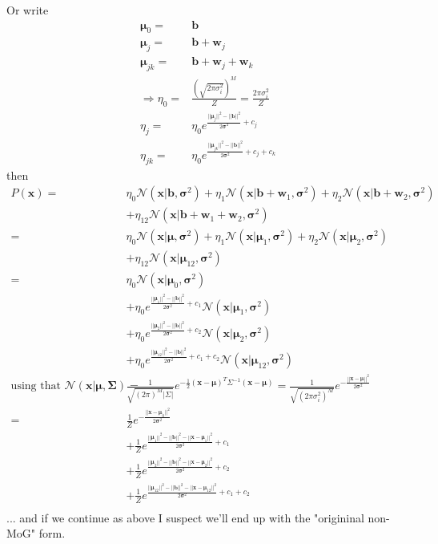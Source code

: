 \documentclass[twoside,english]{uiofysmaster}
\begin{document}
Or write
\begin{align}
	\bm{\mu}_0 =& \bm{b} \\
	\bm{\mu}_j =& \bm{b} + \bm{w}_j \\
	\bm{\mu}_{jk} =& \bm{b} + \bm{w}_j + \bm{w}_k \\
	\Rightarrow 
	\eta_0 =& \frac{(\sqrt{2\pi \sigma_i^2})^M}{Z} =  \frac{2\pi \sigma_i^2}{Z} \\
	\eta_j =& \eta_0 e^{\frac{||\bm{\mu}_j||^2 - ||\bm{b}||^2}{2\bm{\sigma}^2} + c_j} \\
	\eta_{jk} =& \eta_0 e^{\frac{||\bm{\mu}_{jk}||^2 - ||\bm{b}||^2}{2\bm{\sigma}^2} + c_j + c_k}
\end{align}
then
\begin{align}
	P(\bm{x})=& \eta_0 \mathcal{N}(\bm{x}|\bm{b}, \bm{\sigma}^2)
	+ \eta_1 \mathcal{N} (\bm{x}| \bm{b} + \bm{w}_1, \bm{\sigma}^2)
	+ \eta_2 \mathcal{N} (\bm{x}| \bm{b} + \bm{w}_2, \bm{\sigma}^2) \nonumber \\
	&+ \eta_{12} \mathcal{N} (\bm{x}|\bm{b}+\bm{w}_1 + \bm{w}_2, \bm{\sigma}^2) \\
	=& \eta_0 \mathcal{N}(\bm{x}|\bm{\mu}, \bm{\sigma}^2)
	+ \eta_1 \mathcal{N} (\bm{x}| \bm{\mu}_1, \bm{\sigma}^2)
	+ \eta_2 \mathcal{N} (\bm{x}| \bm{\mu}_2, \bm{\sigma}^2) \nonumber \\ 
	&+ \eta_{12} \mathcal{N} (\bm{x}|\bm{\mu}_{12}, \bm{\sigma}^2) \\
	=& \eta_0 \mathcal{N}(\bm{x}|\bm{\mu}_0, \bm{\sigma}^2) \nonumber \\ 
	&+ \eta_0 e^{\frac{||\bm{\mu}_1||^2 - ||\bm{b}||^2}{2\bm{\sigma}^2} + c_1} 
	\mathcal{N} (\bm{x}| \bm{\mu}_1, \bm{\sigma}^2) \nonumber \\ 
	&+ \eta_0 e^{\frac{||\bm{\mu}_2||^2 - ||\bm{b}||^2}{2\bm{\sigma}^2} + c_2} 
	\mathcal{N} (\bm{x}| \bm{\mu}_2, \bm{\sigma}^2) \nonumber \\ 
	&+ \eta_0 e^{\frac{||\bm{\mu}_{12}||^2 - ||\bm{b}||^2}{2\bm{\sigma}^2} + c_1 + c_2}
	\mathcal{N} (\bm{x}|\bm{\mu}_{12}, \bm{\sigma}^2) \\
	\text{using that } 
	\mathcal{N}(\bm{x}| \bm{\mu}, \bm{\Sigma}) 
	=& \frac{1}{\sqrt{(2\pi)^M |\Sigma|}} e^{-\frac{1}{2} (\bm{x}-\bm{\mu})^T\Sigma^{-1} (\bm{x}-\bm{\mu})} %
	= \frac{1}{\sqrt{(2\pi\sigma_i^2)^M}} e^{-\frac{||\bm{x}-\bm{\mu}||^2}{2\bm{\sigma}^2}} \nonumber \\
	=& \frac{1}{Z} e^{-\frac{||\bm{x}-\bm{\mu}_0||^2}{2\bm{\sigma}^2}} \nonumber \\ 
	&+ \frac{1}{Z} e^{\frac{||\bm{\mu}_1||^2 - ||\bm{b}||^2 - ||\bm{x}-\bm{\mu}_1||^2}{2\bm{\sigma}^2} + c_1} \\ 
	&+ \frac{1}{Z} e^{\frac{||\bm{\mu}_2||^2 - ||\bm{b}||^2 - ||\bm{x}-\bm{\mu}_2||^2}{2\bm{\sigma}^2} + c_2}  \\ 
	&+ \frac{1}{Z} e^{\frac{||\bm{\mu}_{12}||^2 - ||\bm{b}||^2 - ||\bm{x}-\bm{\mu}_{12}||^2}{2\bm{\sigma}^2} + c_1 + c_2} \\
\end{align}
... and if we continue as above I suspect we'll end up with the "origininal non-MoG" form.
\end{document}
